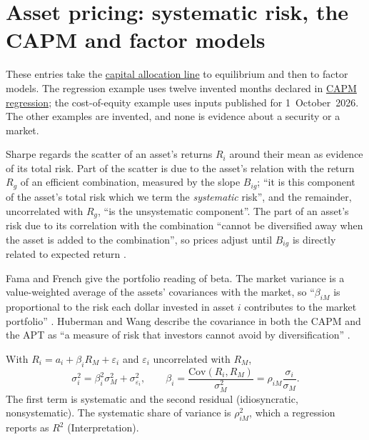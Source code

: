 \section{Asset pricing: systematic risk, the CAPM and factor models}

These entries take the \hyperref[meth:capital-allocation-line]{capital allocation line} to equilibrium and then to factor models. The regression example uses twelve invented months declared in \hyperref[meth:capm-regression]{CAPM regression}; the cost-of-equity example uses inputs published for 1~October~2026. The other examples are invented, and none is evidence about a security or a market.

\begin{qfmechanism}\label{mech:systematic-risk-pricing}
 Sharpe regards the scatter of an asset's returns $R_i$ around their mean as evidence of its total risk. Part of the scatter is due to the asset's relation with the return $R_g$ of an efficient combination, measured by the slope $B_{ig}$; ``it is this component of the asset's total risk which we term the \emph{systematic} risk'', and the remainder, uncorrelated with $R_g$, ``is the unsystematic component''. The part of an asset's risk due to its correlation with the combination ``cannot be diversified away when the asset is added to the combination'', so prices adjust until $B_{ig}$ is directly related to expected return \citep[\emph{Journal of Finance} 19(3), 1964, pp.~438--440 and Fig.~8]{capital-asset-prices-1964}.

Fama and French give the portfolio reading of beta. The market variance is a value-weighted average of the assets' covariances with the market, so ``$\beta_{iM}$ is proportional to the risk each dollar invested in asset $i$ contributes to the market portfolio'' \citep[\emph{JEP} 18(3), 2004, pp.~28--29 and n.~3]{capm-theory-evidence-2004}. Huberman and Wang describe the covariance in both the CAPM and the APT as ``a measure of risk that investors cannot avoid by diversification'' \citep[FRBNY Staff Report 216, August 2005, sec.~1]{arbitrage-pricing-review-2005}.

 With $R_i=a_i+\beta_iR_M+\varepsilon_i$ and $\varepsilon_i$ uncorrelated with $R_M$,
\[ \sigma_i^2=\beta_i^2\sigma_M^2+\sigma_{\varepsilon_i}^2,\qquad \beta_i=\frac{\mathrm{Cov}(R_i,R_M)}{\sigma_M^2}=\rho_{iM}\frac{\sigma_i}{\sigma_M}. \]
The first term is systematic and the second residual (idiosyncratic, nonsystematic). The systematic share of variance is $\rho_{iM}^2$, which a regression reports as $R^2$ (Interpretation).


\end{qfmechanism}
